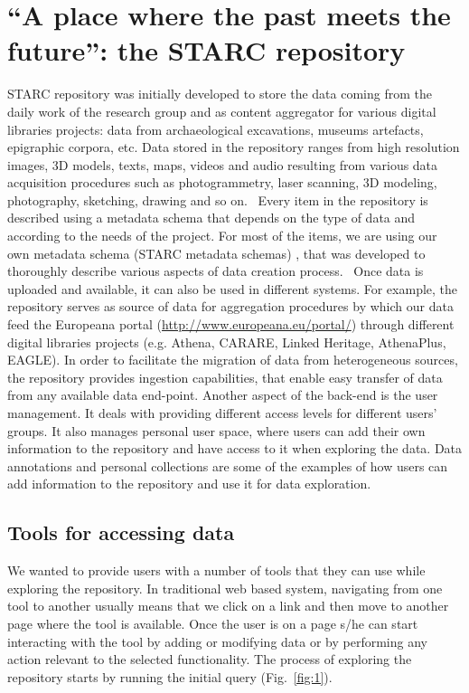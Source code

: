 \documentclass[amsthm,ebook]{saparticle}
\begin{document}
\section{``A place where the past meets the future'': the STARC repository}


\noindent STARC repository was initially developed to store the data coming from the daily work of the research group and as
content aggregator for various digital libraries projects: data from archaeological excavations, museums artefacts,
epigraphic corpora, etc. Data stored in the repository ranges from high resolution images, 3D models, texts, maps,
videos and audio resulting from various data acquisition procedures such as photogrammetry, laser scanning, 3D
modeling, photography, sketching, drawing and so on. \ Every item in the repository is described using a metadata
schema that depends on the type of data and according to the needs of the project. For most of the items, we are using
our own metadata schema (STARC metadata schemas) \citep{ronzino_metadata_2012, vassallo_revealing_2013}, that was developed to
thoroughly describe various aspects of data creation process. \ Once data is uploaded and available, it can also be
used in different systems. For example, the repository serves as source of data for aggregation procedures by which our
data feed the Europeana portal (\url{http://www.europeana.eu/portal/}) through different digital libraries projects (e.g.
Athena, CARARE, Linked Heritage, AthenaPlus, EAGLE). In order to facilitate the migration of data from heterogeneous
sources, the repository provides ingestion capabilities, that enable easy transfer of data from any available data
end-point. Another aspect of the back-end is the user management. It deals with providing different access levels for
different users’ groups. It also manages personal user space, where users can add their own information to the
repository and have access to it when exploring the data. Data annotations and personal collections are some of the
examples of how users can add information to the repository and use it for data exploration. 




\subsection{Tools for accessing data }


\noindent We wanted to provide users with a number of tools that they can use while exploring the repository. In traditional web
based system, navigating from one tool to another usually means that we click on a link and then move to another page
where the tool is available. Once the user is on a page s/he can start interacting with the tool by adding or modifying
data or by performing any action relevant to the selected functionality. The process of exploring the repository starts
by running the initial query (Fig.~\ref{fig:1}). 
\end{document}
